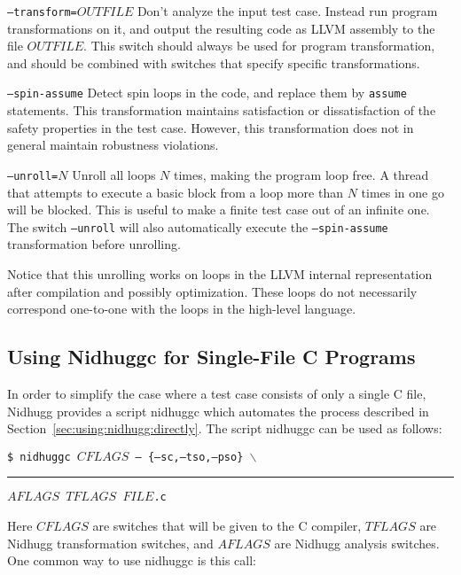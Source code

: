 \documentclass[a4paper]{article}
\begin{document}
\begin{description}
\item{\texttt{--transform=$OUTFILE$}}
%
  Don't analyze the input test case. Instead run program
  transformations on it, and output the resulting code as LLVM
  assembly to the file $OUTFILE$. This switch should always be used
  for program transformation, and should be combined with switches
  that specify specific transformations.
\item{\texttt{--spin-assume}}
%
  Detect spin loops in the code, and replace them by \texttt{assume}
  statements. This transformation maintains satisfaction or
  dissatisfaction of the safety properties in the test case. However,
  this transformation does not in general maintain robustness
  violations.
\item{\texttt{--unroll=$N$}}
%
  Unroll all loops $N$ times, making the program loop free. A thread
  that attempts to execute a basic block from a loop more than $N$
  times in one go will be blocked. This is useful to make a finite
  test case out of an infinite one. The switch \texttt{--unroll} will
  also automatically execute the \texttt{--spin-assume} transformation
  before unrolling.

  Notice that this unrolling works on loops in the LLVM internal
  representation after compilation and possibly optimization. These
  loops do not necessarily correspond one-to-one with the loops in the
  high-level language.
\end{description}

\subsection{Using Nidhuggc for Single-File C Programs}\label{sec:using:nidhuggc}

In order to simplify the case where a test case consists of only a
single C file, Nidhugg provides a script \textsf{nidhuggc} which
automates the process described in
Section~\ref{sec:using:nidhugg:directly}. The script \textsf{nidhuggc}
can be used as follows:

\vspace{5pt}
\noindent
\texttt{\$ nidhuggc $CFLAGS$ -- \{--sc,--tso,--pso\} $\backslash$}\\
\rule{20pt}{0pt}\texttt{$AFLAGS$ $TFLAGS$ $FILE$.c}

\vspace{5pt}\noindent
%
Here $CFLAGS$ are switches that will be given to the C compiler,
$TFLAGS$ are Nidhugg transformation switches, and $AFLAGS$ are Nidhugg
analysis switches. One common way to use \textsf{nidhuggc} is this
call:
\end{document}
